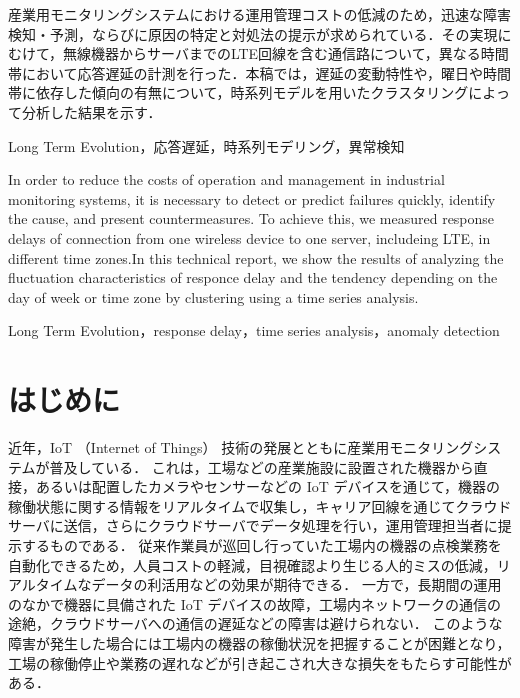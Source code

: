 \documentclass[technicalreport]{ieicej}
\begin{document}
\begin{jabstract}
産業用モニタリングシステムにおける運用管理コストの低減のため，迅速な障害検知・予測，ならびに原因の特定と対処法の提示が求められている．その実現にむけて，無線機器からサーバまでのLTE回線を含む通信路について，異なる時間帯において応答遅延の計測を行った．本稿では，遅延の変動特性や，曜日や時間帯に依存した傾向の有無について，時系列モデルを用いたクラスタリングによって分析した結果を示す．
\end{jabstract}
\begin{jkeyword}
Long Term Evolution，応答遅延，時系列モデリング，異常検知
\end{jkeyword}
\begin{eabstract}
In order to reduce the costs of operation and management in industrial monitoring systems, it is necessary to detect or predict failures quickly, identify the cause, and present countermeasures. To achieve this, we measured response delays of connection from one wireless device to one server, includeing LTE, in different time zones.In this technical report, we show the results of analyzing the fluctuation characteristics of responce delay and the tendency depending on the day of week or time zone by clustering using a time series analysis.
\end{eabstract}
\begin{ekeyword}
Long Term Evolution，response delay，time series analysis，anomaly detection
\end{ekeyword}
\maketitle

\section{はじめに}
近年，IoT （Internet of Things） 技術の発展とともに産業用モニタリングシステム\cite{monitering}が普及している．
これは，工場などの産業施設に設置された機器から直接，あるいは配置したカメラやセンサーなどの IoT デバイスを通じて，機器の稼働状態に関する情報をリアルタイムで収集し，キャリア回線を通じてクラウドサーバに送信，さらにクラウドサーバでデータ処理を行い，運用管理担当者に提示するものである．
従来作業員が巡回し行っていた工場内の機器の点検業務を自動化できるため，人員コストの軽減，目視確認より生じる人的ミスの低減，リアルタイムなデータの利活用などの効果が期待できる．
一方で，長期間の運用のなかで機器に具備された IoT デバイスの故障，工場内ネットワークの通信の途絶，クラウドサーバへの通信の遅延などの障害は避けられない．
このような障害が発生した場合には工場内の機器の稼働状況を把握することが困難となり，工場の稼働停止や業務の遅れなどが引き起こされ大きな損失をもたらす可能性がある．
\end{document}
